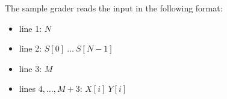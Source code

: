 The sample grader reads the input in the following format:

\begin{itemize}
\item line 1: $N$
\item line 2: $S[0]\ \ldots\ S[N - 1]$
\item line 3: $M$
\item lines $4, \ldots, M + 3$: $X[i]\ Y[i]$
\end{itemize}